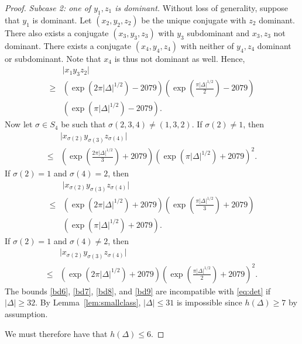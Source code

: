\documentclass[10pt,a4paper]{amsart}
\begin{document}
\begin{proof}
\textit{Subcase 2: one of $y_1, z_1$ is dominant.} Without loss of generality, suppose that $y_1$ is dominant. Let $(x_2, y_2, z_2)$ be the unique conjugate with $z_2$ dominant. There also exists a conjugate $(x_3, y_3, z_3)$ with $y_3$ subdominant and $x_3, z_3$ not dominant. There exists a conjugate $(x_4, y_4, z_4)$ with neither of $y_4, z_4$ dominant or subdominant. Note that $x_4$ is thus not dominant as well. Hence,
\begin{align}\label{bd6}
	&\lvert x_1 y_3 z_2 \rvert \nonumber\\
	\geq &(\exp(2 \pi \lvert \Delta \rvert^{1/2}) - 2079)\left(\exp\left(\frac{\pi \lvert \Delta \rvert^{1/2}}{2}\right) - 2079\right) \nonumber \\
	&(\exp(\pi \lvert \Delta \rvert^{1/2}) - 2079).
\end{align}
Now let $\sigma \in S_4$ be such that $\sigma(2, 3, 4) \neq (1, 3, 2)$. If $\sigma(2) \neq 1$, then
\begin{align}\label{bd7}
	&\lvert x_{\sigma(2)} y_{\sigma(3)} z_{\sigma(4)} \rvert \nonumber \\
	\leq &\left(\exp\left(\frac{2 \pi \lvert \Delta \rvert^{1/2}}{3}\right) + 2079\right)(\exp(\pi \lvert \Delta \rvert^{1/2}) + 2079)^2.
\end{align}
If $\sigma(2) = 1$ and $\sigma(4) = 2$, then
\begin{align}\label{bd8}
	&\lvert x_{\sigma(2)} y_{\sigma(3)} z_{\sigma(4)} \rvert \nonumber \\ 
	\leq &(\exp(2 \pi \lvert \Delta \rvert^{1/2}) + 2079)\left(\exp\left(\frac{\pi \lvert \Delta \rvert^{1/2}}{3}\right) + 2079\right) \nonumber \\
	&(\exp(\pi \lvert \Delta \rvert^{1/2}) + 2079).
\end{align}
If $\sigma(2) = 1$ and $\sigma(4) \neq 2$, then
\begin{align}\label{bd9}
	&\lvert x_{\sigma(2)} y_{\sigma(3)} z_{\sigma(4)} \rvert \nonumber \\
	\leq &(\exp(2 \pi \lvert \Delta \rvert^{1/2}) + 2079)\left(\exp\left(\frac{\pi \lvert \Delta \rvert^{1/2}}{2}\right) + 2079\right)^2.
\end{align}
The bounds \eqref{bd6}, \eqref{bd7}, \eqref{bd8}, and \eqref{bd9} are incompatible with \eqref{eq:det} if $\lvert \Delta \rvert \geq 32$. By Lemma~\ref{lem:smallclass}, $\lvert \Delta \rvert \leq 31$ is impossible since $h(\Delta) \geq 7$ by assumption.

We must therefore have that $h(\Delta) \leq 6$.
\end{proof}
\end{document}
